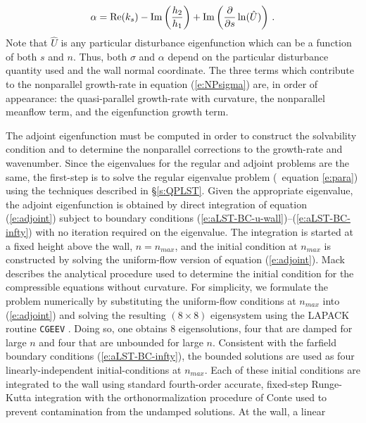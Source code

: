 %
\begin{equation} \label{e:NPalpha}
  \alpha = {\rm Re}( k_s ) - {\rm Im}\left(\frac{h_2}{h_1}\right) +
           {\rm Im}\left( \frac{\partial}{\partial s} \ln (\hat U) \right)
  {\, .}
\end{equation}
%
Note that $\hat U$ is any particular disturbance eigenfunction which can be a
function of both $s$ and $n$.  Thus, both $\sigma$ and $\alpha$ depend on the
particular disturbance quantity used and the wall normal coordinate.  The
three terms which contribute to the nonparallel growth-rate in equation
(\ref{e:NPsigma}) are, in order of appearance: the quasi-parallel growth-rate
with curvature, the nonparallel meanflow term, and the eigenfunction growth
term.

%
%
The adjoint eigenfunction must be computed in order to construct the
solvability condition and to determine the nonparallel corrections to the
growth-rate and wavenumber.  Since the eigenvalues for the regular and adjoint
problems are the same, the first-step is to solve the regular eigenvalue
problem (\ie\ equation \ref{e:para}) using the techniques described in
\S\ref{s:QPLST}.  Given the appropriate eigenvalue, the adjoint eigenfunction
is obtained by direct integration of equation (\ref{e:adjoint}) subject to
boundary conditions (\ref{e:aLST-BC-u-wall})--(\ref{e:aLST-BC-infty}) with no
iteration required on the eigenvalue.  The integration is started at a fixed
height above the wall, $n=n_{max}$, and the initial condition at $n_{max}$ is
constructed by solving the uniform-flow version of equation (\ref{e:adjoint}).
Mack \cite{Mack:84a} describes the analytical procedure used to determine the
initial condition for the compressible equations without curvature.  For
simplicity, we formulate the problem numerically by substituting the
uniform-flow conditions at $n_{max}$ into (\ref{e:adjoint}) and solving the
resulting $(8\times 8)$ eigensystem using the LAPACK routine {\tt CGEEV}
\cite{Lapack:92}.  Doing so, one obtains 8 eigensolutions, four that are
damped for large $n$ and four that are unbounded for large $n$.  Consistent
with the farfield boundary conditions (\ref{e:aLST-BC-infty}), the bounded
solutions are used as four linearly-independent initial-conditions at
$n_{max}$.  Each of these initial conditions are integrated to the wall using
standard fourth-order accurate, fixed-step Runge-Kutta integration with the
orthonormalization procedure of Conte \cite{Conte:66} used to prevent
contamination from the undamped solutions.  At the wall, a linear
